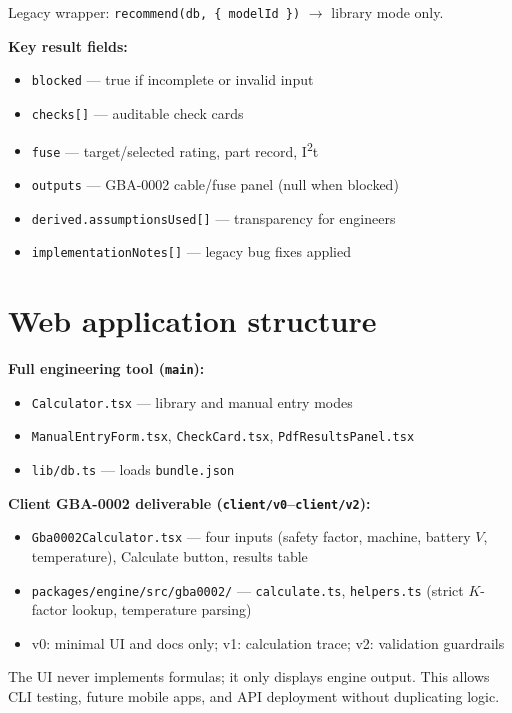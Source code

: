 \documentclass[11pt,a4paper]{report}
\begin{document}
Legacy wrapper: \texttt{recommend(db, \{ modelId \})} $\rightarrow$ library mode only.

\textbf{Key result fields:}
\begin{itemize}[noitemsep]
  \item \texttt{blocked} --- true if incomplete or invalid input
  \item \texttt{checks[]} --- auditable check cards
  \item \texttt{fuse} --- target/selected rating, part record, I\textsuperscript{2}t
  \item \texttt{outputs} --- GBA-0002 cable/fuse panel (null when blocked)
  \item \texttt{derived.assumptionsUsed[]} --- transparency for engineers
  \item \texttt{implementationNotes[]} --- legacy bug fixes applied
\end{itemize}

\section{Web application structure}

\textbf{Full engineering tool (\texttt{main}):}
\begin{itemize}[noitemsep]
  \item \texttt{Calculator.tsx} --- library and manual entry modes
  \item \texttt{ManualEntryForm.tsx}, \texttt{CheckCard.tsx}, \texttt{PdfResultsPanel.tsx}
  \item \texttt{lib/db.ts} --- loads \texttt{bundle.json}
\end{itemize}

\textbf{Client GBA-0002 deliverable (\texttt{client/v0}--\texttt{client/v2}):}
\begin{itemize}[noitemsep]
  \item \texttt{Gba0002Calculator.tsx} --- four inputs (safety factor, machine, battery $V$, temperature), Calculate button, results table
  \item \texttt{packages/engine/src/gba0002/} --- \texttt{calculate.ts}, \texttt{helpers.ts} (strict $K$-factor lookup, temperature parsing)
  \item v0: minimal UI and docs only; v1: calculation trace; v2: validation guardrails
\end{itemize}

The UI never implements formulas; it only displays engine output. This allows CLI testing, future mobile apps, and API deployment without duplicating logic.
\end{document}
